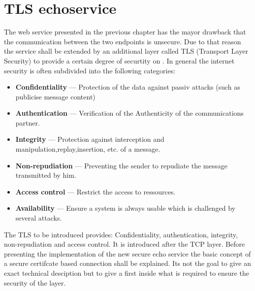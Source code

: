 \chapter{TLS echoservice}

The web service presented in the previous chapter has the mayor drawback that the communication between the two endpoints is unsecure.
Due to that reason the service  shall be extended by an additional layer called TLS (Transport Layer Security) to provide a certain degree of securtity on .
%
In general the internet security is often subdivided into the following categories:~\cite{TANNENBAUM_2001}
\begin{itemize}
	\item \textbf{Confidentiality} --- Protection of the data against passiv attacks (such as publicise message content)
	
	\item \textbf{Authentication} --- Verification of the Authenticity  of the communications partner.

	\item \textbf{Integrity} --- Protection against interception and manipulation,replay,insertion, etc.  of a message.

	\item \textbf{Non-repudiation} --- Preventing the sender to repudiate the message transmitted by him.

	\item \textbf{Access control} --- Restrict the access to ressources.

	\item \textbf{Availability} --- Ensure a system is always usable which is challenged by several attacks.

\end{itemize}
%
The TLS to be introduced provides: Confidentiality, authentication, integrity, non-repudiation and access control.
It is introduced after the TCP layer. 
%
Before presenting the implementation of the new secure echo service the basic concept of a secure certifcate based connection shall be explained. Its not the goal to give an exact technical desciption but to give a first inside what is required to ensure the security of the layer.

